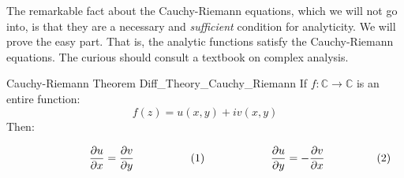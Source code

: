 \documentclass[crop=false,class=book,oneside]{standalone}
\begin{document}
            The remarkable fact about the Cauchy-Riemann equations,
            which we will not go into, is that they are a
            necessary and \textit{sufficient}
            condition for analyticity. We will prove the easy part.
            That is, the analytic functions satisfy the
            Cauchy-Riemann equations.
            The curious should consult a textbook on
            complex analysis.
            \newpage
            \begin{ftheorem}{Cauchy-Riemann Theorem}
                            {Diff_Theory_Cauchy_Riemann}
                If $f:\mathbb{C}\rightarrow\mathbb{C}$ is an
                entire function:
                \begin{equation}
                    f(z)=u(x,y)+iv(x,y)
                \end{equation}
                Then:
                \par
                \begin{subequations}
                    \begin{minipage}{0.49\textwidth}
                        \begin{equation}
                            \frac{\partial{u}}{\partial{x}}=
                            \frac{\partial{v}}{\partial{y}}
                        \end{equation}
                    \end{minipage}
                    \hfill
                    \begin{minipage}{0.49\textwidth}
                        \begin{equation}
                            \frac{\partial{u}}{\partial{y}}=
                            -\frac{\partial{v}}{\partial{x}}
                        \end{equation}
                    \end{minipage}
                \end{subequations}
                \par\hfill\par
            \end{ftheorem}
\end{document}

